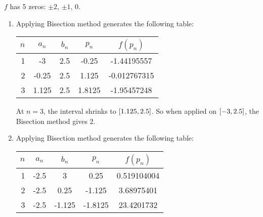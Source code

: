 \documentclass[../../../../Assignments.tex]{subfiles}
\begin{document}
\begin{solution}
    \(f\) has 5 zeros: \(\pm 2\), \(\pm 1\), \(0\).

    \begin{enumerate}[label = (\alph*)]
        \item Applying Bisection method generates the following table:

            \begin{table}[H]
                \centering
                \begin{tabular}{r S[table-format=-1.3] S[table-format=1.1] S[table-format=-1.4] S[table-format=-1.9]}
                    \toprule
                    \(n\)  &   {\(a_n\)}   &   {\(b_n\)}   &   {\(p_n\)}   &  {\(f(p_n)\)}  \\
                      &  -3           &  2.5          &  -0.25        &  -1.44195557   \\
                        2  &  -0.25        &  2.5          &   1.125       &  -0.012767315  \\
                        3  &   1.125       &  2.5          &   1.8125      &  -1.95457248   \\
                    \bottomrule
                \end{tabular}
            \end{table}

            At \(n = 3\), the interval shrinks to
            \(\interval{\num{1.125}}{\num{2.5}}\). So when applied on
            \(\interval{-3}{\num{2.5}}\), the Bisection method gives \(2\).

        \item Applying Bisection method generates the following table:

            \begin{table}[H]
                \centering
                \begin{tabular}{r S[table-format=-1.1] S[table-format=-1.3] S[table-format=-1.4] S[table-format=2.9]}
                    \toprule
                    \(n\)  &   {\(a_n\)}   &   {\(b_n\)}   &   {\(p_n\)}   &  {\(f(p_n)\)}  \\
                      &  -2.5         &   3           &   0.25        &    0.519104004 \\
                        2  &  -2.5         &   0.25        &  -1.125       &    3.68975401  \\
                        3  &  -2.5         &  -1.125       &  -1.8125      &   23.4201732   \\
                    \bottomrule
                \end{tabular}
            \end{table}


\end{enumerate}
\end{solution}
\end{document}
